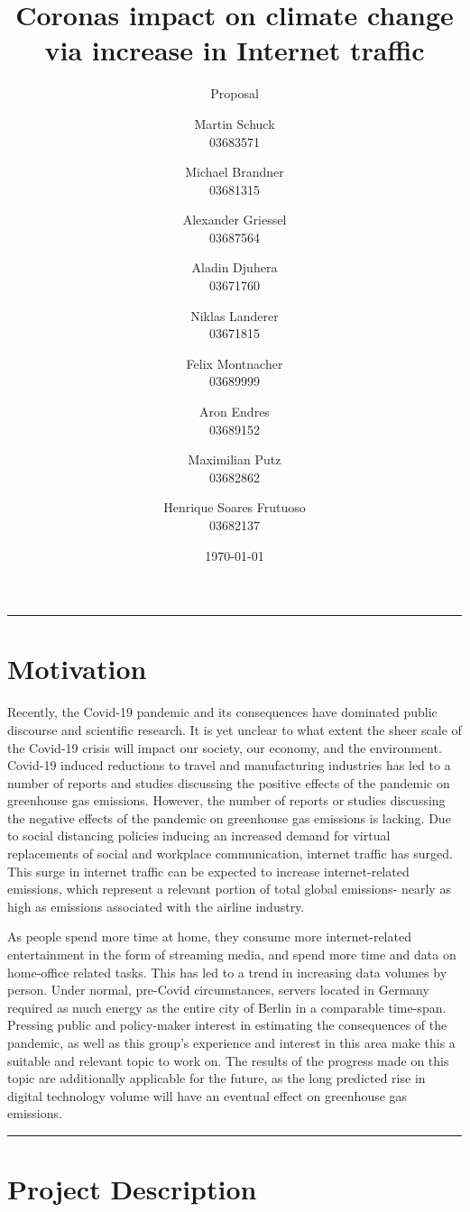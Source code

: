 \documentclass[s=english,inputenc=utf8,fontsize=10pt]{ldvarticle}
\title{Coronas impact on climate change via increase in Internet traffic}
\subtitle{Proposal}
\author{Martin Schuck\\
03683571
\and
Michael Brandner\\
03681315
\and
Alexander Griessel\\
03687564
\and
Aladin Djuhera\\
03671760
\and
Niklas Landerer\\
03671815
\and
Felix Montnacher\\
03689999
\and
Aron Endres\\
03689152
\and
Maximilian Putz\\
03682862
\and
Henrique Soares Frutuoso\\
03682137
}
\date{\today}
\begin{document}
\maketitle
\thispagestyle{empty}

\hrule
\setlength{\parskip}{0cm}
\section*{Motivation}

Recently, the Covid-19 pandemic and its consequences have dominated public discourse and scientific research. It is yet unclear to what extent the sheer scale of the Covid-19 crisis will impact our society, our economy, and the environment. Covid-19 induced reductions to travel and manufacturing industries has led to a number of reports and studies discussing the positive effects of the pandemic on greenhouse gas emissions. However, the number of reports or studies discussing the negative effects of the pandemic on greenhouse gas emissions is lacking. Due to social distancing policies inducing an increased demand for virtual replacements of social and workplace communication, internet traffic has surged. This surge in internet traffic can be expected to increase internet-related emissions, which represent a relevant portion of total global emissions- nearly as high as emissions associated with the airline industry. 

As people spend more time at home, they consume more internet-related entertainment in the form of streaming media, and spend more time and data on home-office related tasks. This has led to a trend in increasing data volumes by person. Under normal, pre-Covid circumstances, servers located in Germany required as much energy as the entire city of Berlin in a comparable time-span. Pressing public and policy-maker interest in estimating the consequences of the pandemic, as well as this group’s experience and interest in this area make this a suitable and relevant topic to work on. The results of the progress made on this topic are additionally applicable for the future, as the long predicted rise in digital technology volume will have an eventual effect on greenhouse gas emissions.

\vspace*{0.5cm}
\hrule

\newpage

\section{Project Description}
\end{document}
